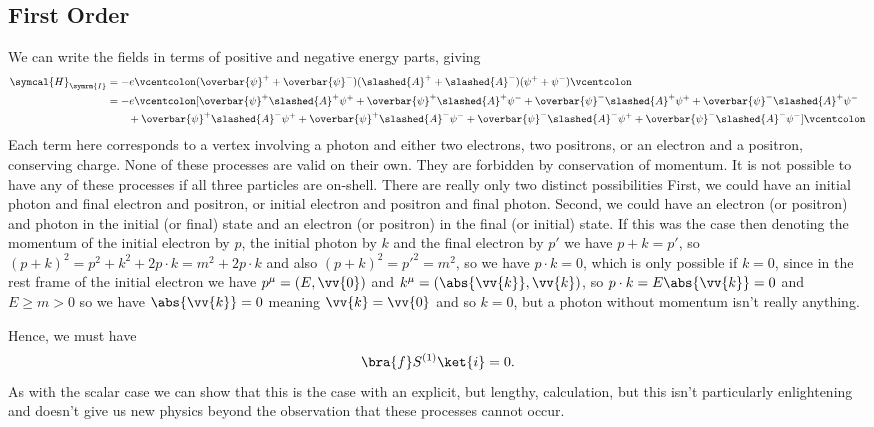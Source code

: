 \documentclass[fleqn]{NotesClass}
\newcommand{\hamiltonianDensity}{\symcal{H}}
\newcommand{\normalordering}[1]{\mathopen{\vcentcolon}{#1}\mathclose{\vcentcolon}}
\newcommand{\interaction}{\symrm{I}}
\newcommand{\diracadjoint}[1]{\overbar{#1}}
\begin{document}
    \subsection{First Order}
    We can write the fields in terms of positive and negative energy parts, giving
    \begin{align}
        \hamiltonianDensity_{\interaction} &= -e\normalordering{(\diracadjoint{\psi}^+ + \diracadjoint{\psi}^-)(\slashed{A}^+ + \slashed{A}^-)(\psi^+ + \psi^-)}\\
        &= -e{\vcentcolon}[\diracadjoint{\psi}^+\slashed{A}^+\psi^+ + \diracadjoint{\psi}^+\slashed{A}^+\psi^- + \diracadjoint{\psi}^-\slashed{A}^+\psi^+ + \diracadjoint{\psi}^-\slashed{A}^+\psi^-\\
        &\qquad + \diracadjoint{\psi}^+\slashed{A}^-\psi^+ + \diracadjoint{\psi}^+\slashed{A}^-\psi^- + \diracadjoint{\psi}^-\slashed{A}^-\psi^+ + \diracadjoint{\psi}^-\slashed{A}^-\psi^-]{\vcentcolon}
    \end{align}
    Each term here corresponds to a vertex involving a photon and either two electrons, two positrons, or an electron and a positron, conserving charge.
    None of these  processes are valid on their own.
    They are forbidden by conservation of momentum.
    It is not possible to have any of these processes if all three particles are on-shell.
    There are really only two distinct possibilities
    First, we could have an initial photon and final electron and positron, or initial electron and positron and final photon.
    Second, we could have an electron (or positron) and photon in the initial (or final) state and an electron (or positron) in the final (or initial) state.
    If this was the case then denoting the momentum of the initial electron by \(p\), the initial photon by \(k\) and the final electron by \(p'\) we have \(p + k = p'\), so \((p + k)^2 = p^2 + k^2 + 2p\cdot k = m^2 + 2p \cdot k\) and also \((p + k)^2 = p'^2 = m^2\), so we have \(p \cdot k = 0\), which is only possible if \(k = 0\), since in the rest frame of the initial electron we have \(p^\mu = (E, \vv{0})\) and \(k^\mu = (\abs{\vv{k}}, \vv{k})\), so \(p \cdot k = E\abs{\vv{k}} = 0\) and \(E \ge m > 0\) so we have \(\abs{\vv{k}} = 0\) meaning \(\vv{k} = \vv{0}\) and so \(k = 0\), but a photon without momentum isn't really anything.
    
    Hence, we must have
    \begin{equation}
        \bra{f} S^{(1)} \ket{i} = 0.
    \end{equation}
    As with the scalar case we can show that this is the case with an explicit, but lengthy, calculation, but this isn't particularly enlightening and doesn't give us new physics beyond the observation that these processes cannot occur.
    
\end{document}
